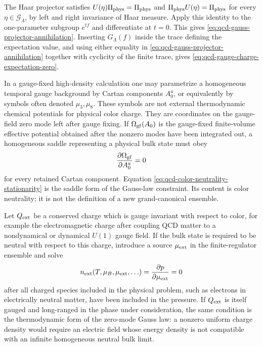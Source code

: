The Haar projector satisfies \(U(\eta)\Pi_{\rm phys}=\Pi_{\rm phys}\) and
\(\Pi_{\rm phys}U(\eta)=\Pi_{\rm phys}\) for every
\(\eta\in\mathcal G_{\Lambda}\), by left and right invariance of Haar
measure.  Apply this identity to the one-parameter subgroup \(e^{tf}\) and
differentiate at \(t=0\).  This gives
\eqref{eq:qcd-gauss-projector-annihilation}.  Inserting \(G_{\Lambda}(f)\)
inside the trace defining the expectation value, and using either equality
in \eqref{eq:qcd-gauss-projector-annihilation} together with cyclicity of
the finite trace, gives \eqref{eq:qcd-gauge-charge-expectation-zero}.

\begin{remark}
\label{rem:qcd-color-chemical-potential-language}
In a gauge-fixed high-density calculation one may parametrize a homogeneous
temporal gauge background by Cartan components \(A_0^a\), or equivalently by
symbols often denoted \(\mu_3,\mu_8\).  These symbols are not external
thermodynamic chemical potentials for physical color charge.  They are
coordinates on the gauge-field zero mode left after gauge fixing.  If
\(\Omega_{\rm gf}(A_0)\) is the gauge-fixed finite-volume effective
potential obtained after the nonzero modes have been integrated out, a
homogeneous saddle representing a physical bulk state must obey
\begin{equation}
  \frac{\partial\Omega_{\rm gf}}{\partial A_0^a}=0
  \label{eq:qcd-color-neutrality-stationarity}
\end{equation}
for every retained Cartan component.  Equation
\eqref{eq:qcd-color-neutrality-stationarity} is the saddle form of the
Gauss-law constraint.  Its content is color neutrality; it is not the
definition of a new grand-canonical ensemble.
\end{remark}

\begin{definition}
\label{def:qcd-neutrality-problem}
Let \(Q_{\rm ext}\) be a conserved charge which is gauge invariant with
respect to color, for example the electromagnetic charge after coupling QCD
matter to a nondynamical or dynamical \(U(1)\) gauge field.  If the bulk
state is required to be neutral with respect to this charge, introduce a
source \(\mu_{\rm ext}\) in the finite-regulator ensemble and solve
\begin{equation}
  n_{\rm ext}(T,\mu_B,\mu_{\rm ext},\ldots)
  =
  \frac{\partial p}{\partial\mu_{\rm ext}}
  =
  0
  \label{eq:qcd-global-neutrality-equation}
\end{equation}
after all charged species included in the physical problem, such as
electrons in electrically neutral matter, have been included in the
pressure.  If \(Q_{\rm ext}\) is itself gauged and long-ranged in the phase
under consideration, the same condition is the thermodynamic form of the
zero-mode Gauss law: a nonzero uniform charge density would require an
electric field whose energy density is not compatible with an infinite
homogeneous neutral bulk limit.
\end{definition}

